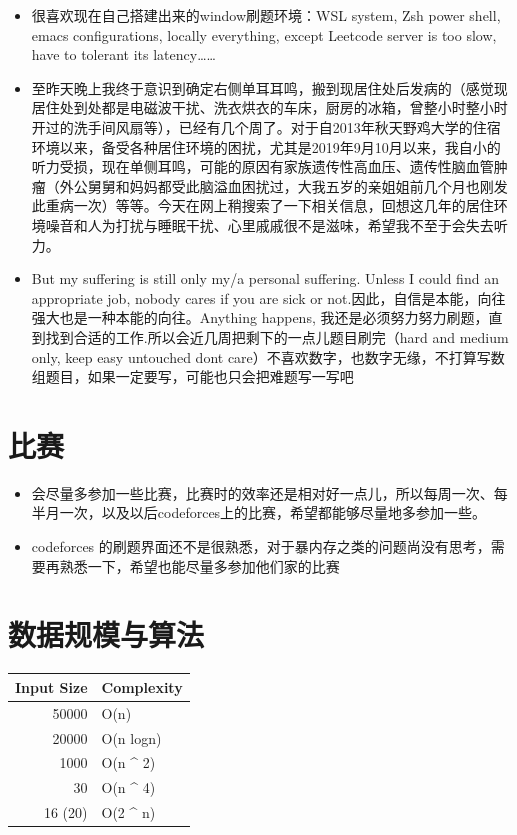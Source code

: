 \documentclass[9pt, b5paaper]{book}
\begin{document}
\begin{itemize}
\item 很喜欢现在自己搭建出来的window刷题环境：WSL system, Zsh power shell, emacs configurations, locally everything, except Leetcode server is too slow, have to tolerant its latency\ldots{}\ldots{}

\item 至昨天晚上我终于意识到确定右侧单耳耳鸣，搬到现居住处后发病的（感觉现居住处到处都是电磁波干扰、洗衣烘衣的车床，厨房的冰箱，曾整小时整小时开过的洗手间风扇等），已经有几个周了。对于自2013年秋天野鸡大学的住宿环境以来，备受各种居住环境的困扰，尤其是2019年9月10月以来，我自小的听力受损，现在单侧耳鸣，可能的原因有家族遗传性高血压、遗传性脑血管肿瘤（外公舅舅和妈妈都受此脑溢血困扰过，大我五岁的亲姐姐前几个月也刚发此重病一次）等等。今天在网上稍搜索了一下相关信息，回想这几年的居住环境噪音和人为打扰与睡眠干扰、心里戚戚很不是滋味，希望我不至于会失去听力。
\item But my suffering is still only my/a personal suffering. Unless I could find an appropriate job, nobody cares if you are sick or not.因此，自信是本能，向往强大也是一种本能的向往。Anything happens, 我还是必须努力努力刷题，直到找到合适的工作.所以会近几周把剩下的一点儿题目刷完（hard and medium only, keep easy untouched dont care）不喜欢数字，也数字无缘，不打算写数组题目，如果一定要写，可能也只会把难题写一写吧
\end{itemize}

\section{比赛}
\label{sec-1-2}
\begin{itemize}
\item 会尽量多参加一些比赛，比赛时的效率还是相对好一点儿，所以每周一次、每半月一次，以及以后codeforces上的比赛，希望都能够尽量地多参加一些。
\item codeforces 的刷题界面还不是很熟悉，对于暴内存之类的问题尚没有思考，需要再熟悉一下，希望也能尽量多参加他们家的比赛
\end{itemize}

\section{数据规模与算法}
\label{sec-1-3}
\begin{center}
\begin{tabular}{rl}
\hline
Input Size & Complexity\\
\hline
50000 & O(n)\\
20000 & O(n logn)\\
\hline
1000 & O(n \^{} 2)\\
30 & O(n \^{} 4)\\
16 (20) & O(2 \^{} n)\\
\hline
\end{tabular}
\end{center}
\end{document}
